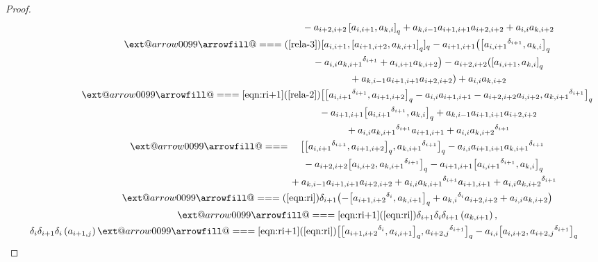 \documentclass[10pt,a4paper]{amsart}
\makeatletter
\def\x@arrow{\DOTSB\Relbar}
\def\xlongequalsignfill@{\arrowfill@\x@arrow\Relbar\x@arrow}
\providecommand{\xlongequal}[2][]{%
	\ext@arrow 0099\xlongequalsignfill@{#1}{#2}}
\numberwithin{equation}{section}
\def\lr#1{\left[#1\right]}
\def\lrb#1{\left(#1\right)}
\def\d{\delta}
\makeatother
\begin{document}
\begin{proof}
\begin{gather*}
 \phantom{ \d_i\d_{i+1}\d_i\lrb{a_{k,i+1}}\xlongequal{\qquad} }{} -a_{i+2,i+2}\lr{a_{i,i+1}, a_{k,i}}_q +a_{k,i-1}a_{i+1,i+1}a_{i+2,i+2} +a_{i,i}a_{k,i+2}\\
 \phantom{ \d_i\d_{i+1}\d_i\lrb{a_{k,i+1}} }{} \xlongequal{\lrb{\ref{rela-3}}} [a_{i,i+1},\lr{a_{i+1,i+2}, a_{k,i+1}}_q]_q -a_{i+1,i+1} \bigl(\bigl[{a_{i,i+1}}^{\d_{i+1}}, a_{k,i}\bigr]_q \\
 \phantom{ \d_i\d_{i+1}\d_i\lrb{a_{k,i+1}}\xlongequal{\qquad} }{} -a_{i,i} {a_{k,i+1}}^{\d_{i+1}} +a_{i,i+1}a_{k,i+2} \bigr) -a_{i+2,i+2}(\lr{a_{i,i+1}, a_{k,i}}_q \\
 \phantom{ \d_i\d_{i+1}\d_i\lrb{a_{k,i+1}}\xlongequal{\qquad} }{}+a_{k,i-1}a_{i+1,i+1}a_{i+2,i+2}) +a_{i,i}a_{k,i+2}\\
 \phantom{ \d_i\d_{i+1}\d_i\lrb{a_{k,i+1}}}{} \xlongequal[\eqref{eqn:ri+1}]{\lrb{\ref{rela-2}}} \bigl[\bigl[{a_{i,i+1}}^{\d_{i+1}}, a_{i+1,i+2}\bigr]_q-a_{i,i}a_{i+1,i+1} -a_{i+2,i+2}a_{i,i+2}, {a_{k,i+1}}^{\d_{i+1}}\bigr]_q \\
 \phantom{ \d_i\d_{i+1}\d_i\lrb{a_{k,i+1}}\xlongequal{\qquad} }{} -a_{i+1,i+1}\bigl[{a_{i,i+1}}^{\d_{i+1}},a_{k,i}\bigr]_q+a_{k,i-1}a_{i+1,i+1}a_{i+2,i+2} \\
 \phantom{ \d_i\d_{i+1}\d_i\lrb{a_{k,i+1}}\xlongequal{\qquad} }{} +a_{i,i}{a_{k,i+1}}^{\d_{i+1}}a_{i+1,i+1}+a_{i,i}{a_{k,i+2}}^{\d_{i+1}}\\
 \phantom{ \d_i\d_{i+1}\d_i\lrb{a_{k,i+1}}}{} \xlongequal{\quad} \bigl[\bigl[{a_{i,i+1}}^{\d_{i+1}}, a_{i+1,i+2}\bigr]_q, {a_{k,i+1}}^{\d_{i+1}}\bigr]_q -a_{i,i}a_{i+1,i+1}{a_{k,i+1}}^{\d_{i+1}} \\
 \phantom{ \d_i\d_{i+1}\d_i\lrb{a_{k,i+1}}\xlongequal{\quad} }{} -a_{i+2,i+2} \bigl[a_{i,i+2}, {a_{k,i+1}}^{\d_{i+1}} \bigr]_q -a_{i+1,i+1} \bigl[{a_{i,i+1}}^{\d_{i+1}}, a_{k,i} \bigr]_q \\
 \phantom{ \d_i\d_{i+1}\d_i\lrb{a_{k,i+1}}\xlongequal{\quad} }{} +a_{k,i-1}a_{i+1,i+1}a_{i+2,i+2} +a_{i,i}{a_{k,i+1}}^{\d_{i+1}} a_{i+1,i+1}+a_{i,i}{a_{k,i+2}}^{\d_{i+1}}\\
 \phantom{ \d_i\d_{i+1}\d_i\lrb{a_{k,i+1}} }{} \xlongequal{\lrb{\ref{eqn:ri}}} \d_{i+1}\bigl(-\bigl[{a_{i+1,i+2}}^{\d_{i}}, a_{k,i+1}\bigr]_q+{a_{k,i}}^{\d_{i}}a_{i+2,i+2} +a_{i,i}a_{k,i+2}\bigr)\\
 \phantom{ \d_i\d_{i+1}\d_i\lrb{a_{k,i+1}} }{} \xlongequal[\eqref{eqn:ri+1}]{\lrb{\ref{eqn:ri}}} \d_{i+1}\d_i\d_{i+1}\lrb{a_{k,i+1}},
 \\
 \d_i\d_{i+1}\d_i\lrb{a_{i+1,j}}
\xlongequal[\eqref{eqn:ri+1}]{\lrb{\ref{eqn:ri}}} \bigl[\bigl[ {a_{i+1,i+2}}^{\d_{i}}, a_{i,i+1}\bigr]_q,{a_{i+2,j}}^{\d_{i+1}}\bigr]_q -a_{i,i}\bigl[a_{i,i+2}, {a_{i+2,j}}^{\d_{i+1}}\bigr]_q \\

\end{gather*}
\end{proof}
\end{document}
